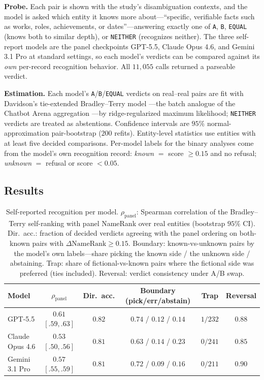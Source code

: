 \textbf{Probe.} Each pair is shown with the study's disambiguation contexts, and the model is asked which entity it knows more about---``specific, verifiable facts such as works, roles, achievements, or dates''---answering exactly one of \texttt{A}, \texttt{B}, \texttt{EQUAL} (knows both to similar depth), or \texttt{NEITHER} (recognizes neither). The three self-report models are the panel checkpoints GPT-5.5, Claude Opus 4.6, and Gemini 3.1 Pro at standard settings, so each model's verdicts can be compared against its \emph{own} per-record recognition behavior. All $11{,}055$ calls returned a parseable verdict.

\textbf{Estimation.} Each model's \texttt{A}/\texttt{B}/\texttt{EQUAL} verdicts on real--real pairs are fit with Davidson's tie-extended Bradley--Terry model \citep{bradley1952rank,davidson1970ties}---the batch analogue of the Chatbot Arena aggregation \citep{chiang2024chatbot}---by ridge-regularized maximum likelihood; \texttt{NEITHER} verdicts are treated as abstentions. Confidence intervals are $95\%$ normal-approximation pair-bootstrap ($200$ refits). Entity-level statistics use entities with at least five decided comparisons. Per-model labels for the binary analyses come from the model's own recognition record: \emph{known} $=$ score $\ge 0.15$ and no refusal; \emph{unknown} $=$ refusal or score $< 0.05$.

\subsection{Results}

\begin{table}[!htbp]
\centering
\small
\caption{Self-reported recognition per model. $\rho_{\text{panel}}$: Spearman correlation of the Bradley--Terry self-ranking with panel NameRank over real entities (bootstrap $95\%$ CI). Dir.\ acc.: fraction of decided verdicts agreeing with the panel ordering on both-known pairs with $\Delta\text{NameRank} \ge 0.15$. Boundary: known-vs-unknown pairs by the model's own labels---share picking the known side / the unknown side / abstaining. Trap: share of fictional-vs-known pairs where the fictional side was preferred (ties included). Reversal: verdict consistency under A/B swap.}
\label{tab:selfreport}
\begin{tabular}{lccccc}
\toprule
Model & $\rho_{\text{panel}}$ & Dir.\ acc. & Boundary (pick/err/abstain) & Trap & Reversal \\
\midrule
GPT-5.5          & $0.61$ {\scriptsize$[.59,.63]$} & $0.82$ & $0.74$ / $0.12$ / $0.14$ & $1/232$ & $0.88$ \\
Claude Opus 4.6  & $0.53$ {\scriptsize$[.50,.56]$} & $0.81$ & $0.63$ / $0.14$ / $0.23$ & $0/241$ & $0.85$ \\
Gemini 3.1 Pro   & $0.57$ {\scriptsize$[.55,.59]$} & $0.81$ & $0.72$ / $0.09$ / $0.16$ & $0/211$ & $0.90$ \\
\bottomrule
\end{tabular}
\end{table}

